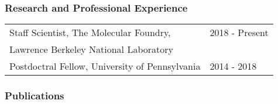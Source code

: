\subsubsection*{Research and Professional Experience}

\begin{table}[ht]
    \centering
    \begin{tabular}{ll}
        Staff Scientist, The Molecular Foundry,  & 2018 - Present   \\
        Lawrence Berkeley National Laboratory & \\
        Postdoctral Fellow, University of Pennsylvania & 2014 - 2018 \\
    \end{tabular}
\end{table}

\subsubsection*{Publications}
